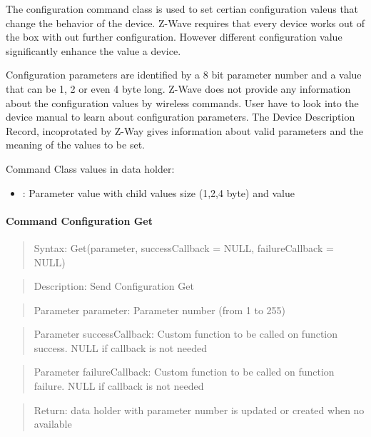 The configuration command class is used to set certian configuration valeus that change the behavior
of the device. Z-Wave requires that every device works out of the box with out further configuration.
However different configuration value significantly enhance the value a device.

Configuration parameters are identified by a 8 bit parameter number and a value that can be 1, 2 or 
even 4 byte long. Z-Wave does not provide any information about the configuration
 values by wireless commands. User have to look into the device manual 
 to learn about configuration parameters. The Device Description Record, incoprotated by Z-Way
 gives information about valid parameters and the meaning of the values to be set.

Command Class values in data holder:
\begin{itemize}
\item []: Parameter value  with child values size (1,2,4 byte) and value
\end{itemize}
 
\paragraph {Command Configuration Get}
\begin{quote} Syntax: Get(parameter, successCallback = NULL, failureCallback = NULL)\end{quote}
\begin{quote} Description: Send Configuration Get\end{quote}
\begin{quote} Parameter parameter: Parameter number (from 1 to 255)\end{quote}
\begin{quote} Parameter successCallback: Custom function to be called on function success. NULL if callback is not needed\end{quote}
\begin{quote} Parameter failureCallback: Custom function to be called on function failure. NULL if callback is not needed\end{quote}
\begin{quote} Return: data holder with parameter number is updated  or created when no available\end{quote}


